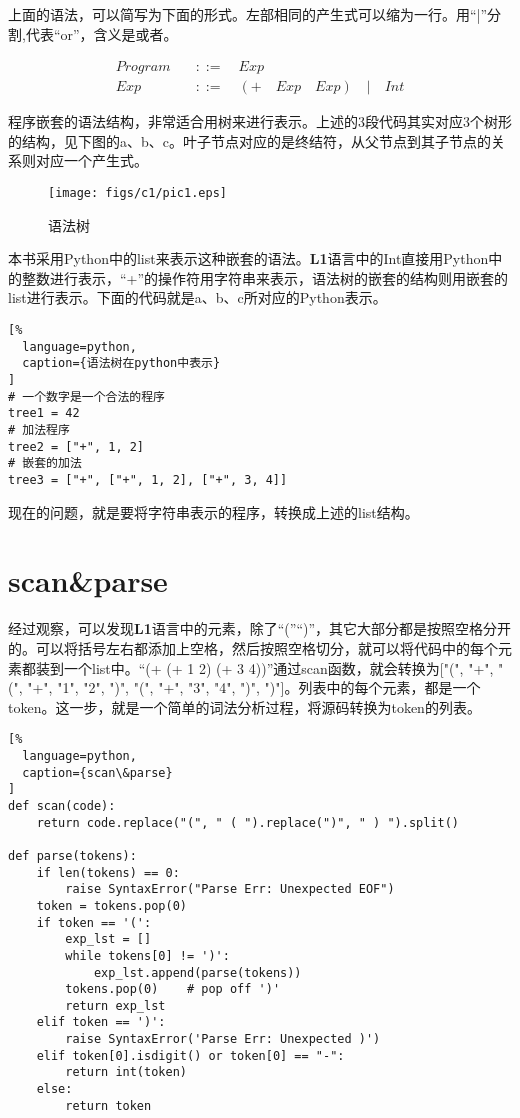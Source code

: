 上面的语法，可以简写为下面的形式。左部相同的产生式可以缩为一行。用“|”分割,代表“or”，含义是或者。

\begin{equation}
\begin{aligned}
  \label{eq:2}
   Program \quad &::= \quad Exp \\
   Exp \quad &::= \quad (+ \quad Exp \quad Exp) \quad | \quad Int
\end{aligned}
\end{equation}

程序嵌套的语法结构，非常适合用树来进行表示。上述的3段代码其实对应3个树形的结构，见下图的a、b、c。叶子节点对应的是终结符，从父节点到其子节点的关系则对应一个产生式。

\begin{figure}[ht]
\centering
\texttt{[image: figs/c1/pic1.eps]}
\caption{语法树}
\label{fig:fig1}
\end{figure}

本书采用Python中的list来表示这种嵌套的语法。\textbf{L1}语言中的Int直接用Python中的整数进行表示，“+”的操作符用字符串来表示，语法树的嵌套的结构则用嵌套的list进行表示。下面的代码就是a、b、c所对应的Python表示。

\begin{lstlisting}[%
  language=python,
  caption={语法树在python中表示}
]
# 一个数字是一个合法的程序
tree1 = 42
# 加法程序
tree2 = ["+", 1, 2]
# 嵌套的加法
tree3 = ["+", ["+", 1, 2], ["+", 3, 4]]
\end{lstlisting}

现在的问题，就是要将字符串表示的程序，转换成上述的list结构。


\section{scan\&parse}

经过观察，可以发现\textbf{L1}语言中的元素，除了“(”“)”，其它大部分都是按照空格分开的。可以将括号左右都添加上空格，然后按照空格切分，就可以将代码中的每个元素都装到一个list中。“(+ (+ 1 2) (+ 3 4))”通过scan函数，就会转换为["(", "+", "(", "+", "1", "2", ")", "(", "+", "3", "4", ")", ")"]。列表中的每个元素，都是一个token。这一步，就是一个简单的词法分析过程，将源码转换为token的列表。

\begin{lstlisting}[%
  language=python,
  caption={scan\&parse}
]
def scan(code):
    return code.replace("(", " ( ").replace(")", " ) ").split()

def parse(tokens):
    if len(tokens) == 0:
        raise SyntaxError("Parse Err: Unexpected EOF")
    token = tokens.pop(0)
    if token == '(':
        exp_lst = []
        while tokens[0] != ')':
            exp_lst.append(parse(tokens))
        tokens.pop(0)    # pop off ')'
        return exp_lst
    elif token == ')':
        raise SyntaxError('Parse Err: Unexpected )')
    elif token[0].isdigit() or token[0] == "-":
        return int(token)
    else:
        return token
\end{lstlisting}

